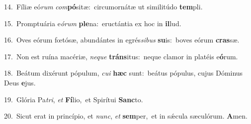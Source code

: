 {\numbfont\textcolor{\numbcolor}{14.}}~Fíliæ eó\textit{rum} \textit{com}\-\textbf{pó}sitæ:~\star circumornátæ ut similitúdo \textbf{tem}\-pli.\par
{\numbfont\textcolor{\numbcolor}{15.}}~Promptuária e\-\textit{ó}\-\textit{rum} \textbf{ple}\-na:~\star eructántia ex hoc in \textbf{il}\-lud.\par
{\numbfont\textcolor{\numbcolor}{16.}}~Oves eórum fœtósæ, abundántes in egrés\-\textit{si}\-\textit{bus} \textbf{su}\-is:~\star boves eórum \textbf{cras}\-sæ.\par
{\numbfont\textcolor{\numbcolor}{17.}}~Non est ruína macériæ, \textit{ne}\-\textit{que} \textbf{tráns}\-itus:~\star neque clamor in platéis e\-\textbf{ó}\-rum.\par
{\numbfont\textcolor{\numbcolor}{18.}}~Beátum dixérunt pópulum, \textit{cu}\-\textit{i} \textbf{hæc} sunt:~\star beátus pópulus, cujus Dóminus Deus \textbf{e}\-jus.\par
{\numbfont\textcolor{\numbcolor}{19.}}~Glória Pa\-\textit{tri}\-, \textit{et} \textbf{Fí}\-lio,~\star et Spirítui \textbf{Sanc}\-to.\par
{\numbfont\textcolor{\numbcolor}{20.}}~Sicut erat in princípio, et \textit{nunc}\-, \textit{et} \textbf{sem}\-per,~\star et in sǽcula sæculórum. \textbf{A}\-men.\par
